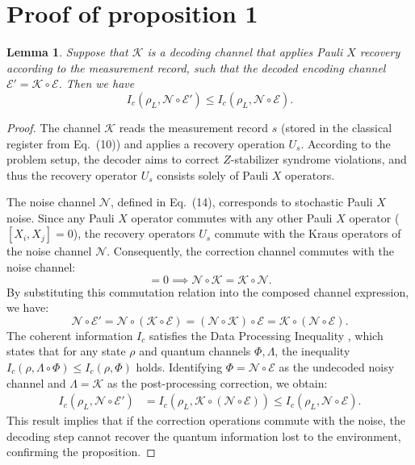 \documentclass[twoside,english,aps,showpacs,pra,superscriptaddress]{revtex4-2}
\newtheorem{lemma}{Lemma}
\begin{document}
\section{Proof of proposition 1}
\begin{lemma}
Suppose that $\mathcal{K}$ is a decoding channel that applies Pauli $X$ recovery according to the measurement record, such that the decoded encoding channel $\mathcal{E}' = \mathcal{K} \circ \mathcal{E}$. Then we have
\begin{equation}
    I_c(\rho_L, \mathcal{N} \circ \mathcal{E}') \leq I_c(\rho_L, \mathcal{N} \circ \mathcal{E}).
\end{equation}
\end{lemma}
\begin{proof}
The channel $\mathcal{K}$ reads the measurement record $s$ (stored in the classical register from Eq.~(10)) and applies a recovery operation $U_s$. According to the problem setup, the decoder aims to correct $Z$-stabilizer syndrome violations, and thus the recovery operator $U_s$ consists solely of Pauli $X$ operators.

The noise channel $\mathcal{N}$, defined in Eq.~(14), corresponds to stochastic Pauli $X$ noise. Since any Pauli $X$ operator commutes with any other Pauli $X$ operator ($[X_i, X_j] = 0$), the recovery operators $U_s$ commute with the Kraus operators of the noise channel $\mathcal{N}$. Consequently, the correction channel commutes with the noise channel:
\begin{equation}
    [\mathcal{N}, \mathcal{K}] = 0 \implies \mathcal{N} \circ \mathcal{K} = \mathcal{K} \circ \mathcal{N}.
\end{equation}
By substituting this commutation relation into the composed channel expression, we have:
\begin{equation}
    \mathcal{N} \circ \mathcal{E}' = \mathcal{N} \circ (\mathcal{K} \circ \mathcal{E}) = (\mathcal{N} \circ \mathcal{K}) \circ \mathcal{E} = \mathcal{K} \circ (\mathcal{N} \circ \mathcal{E}).
\end{equation}
The coherent information $I_c$ satisfies the Data Processing Inequality \cite{schumacherQuantumDataProcessing1996}, which states that for any state $\rho$ and quantum channels $\Phi, \Lambda$, the inequality $I_c(\rho, \Lambda \circ \Phi) \leq I_c(\rho, \Phi)$ holds. Identifying $\Phi = \mathcal{N} \circ \mathcal{E}$ as the undecoded noisy channel and $\Lambda = \mathcal{K}$ as the post-processing correction, we obtain:
\begin{equation}
\begin{aligned}
    I_c(\rho_L, \mathcal{N} \circ \mathcal{E}') &= I_c(\rho_L, \mathcal{K} \circ (\mathcal{N} \circ \mathcal{E})) \leq I_c(\rho_L, \mathcal{N} \circ \mathcal{E}).
\end{aligned}
\end{equation}
This result implies that if the correction operations commute with the noise, the decoding step cannot recover the quantum information lost to the environment, confirming the proposition.
\end{proof}
\end{document}
